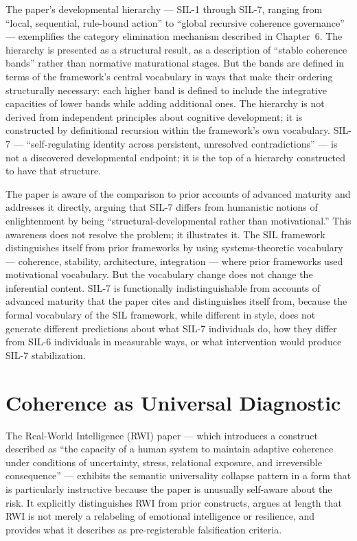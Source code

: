 \documentclass[12pt, openright, twoside]{book}
\begin{document}
The paper's developmental hierarchy --- SIL-1 through SIL-7, ranging from
``local, sequential, rule-bound action'' to ``global recursive coherence
governance'' --- exemplifies the category elimination mechanism described in
Chapter~6. The hierarchy is presented as a structural result, as a description
of ``stable coherence bands'' rather than normative maturational stages. But
the bands are defined in terms of the framework's central vocabulary in ways
that make their ordering structurally necessary: each higher band is defined
to include the integrative capacities of lower bands while adding additional
ones. The hierarchy is not derived from independent principles about cognitive
development; it is constructed by definitional recursion within the framework's
own vocabulary. SIL-7 --- ``self-regulating identity across persistent,
unresolved contradictions'' --- is not a discovered developmental endpoint;
it is the top of a hierarchy constructed to have that structure.

The paper is aware of the comparison to prior accounts of advanced maturity
and addresses it directly, arguing that SIL-7 differs from humanistic notions
of enlightenment by being ``structural-developmental rather than motivational.''
This awareness does not resolve the problem; it illustrates it. The SIL
framework distinguishes itself from prior frameworks by using systems-theoretic
vocabulary --- coherence, stability, architecture, integration --- where prior
frameworks used motivational vocabulary. But the vocabulary change does not
change the inferential content. SIL-7 is functionally indistinguishable from
accounts of advanced maturity that the paper cites and distinguishes itself
from, because the formal vocabulary of the SIL framework, while different
in style, does not generate different predictions about what SIL-7 individuals
do, how they differ from SIL-6 individuals in measurable ways, or what
intervention would produce SIL-7 stabilization.

\section{Coherence as Universal Diagnostic}

The Real-World Intelligence (RWI) paper --- which introduces a construct
described as ``the capacity of a human system to maintain adaptive coherence
under conditions of uncertainty, stress, relational exposure, and irreversible
consequence'' --- exhibits the semantic universality collapse pattern in a
form that is particularly instructive because the paper is unusually self-aware
about the risk. It explicitly distinguishes RWI from prior constructs, argues
at length that RWI is not merely a relabeling of emotional intelligence or
resilience, and provides what it describes as pre-registerable falsification
criteria.
\end{document}
